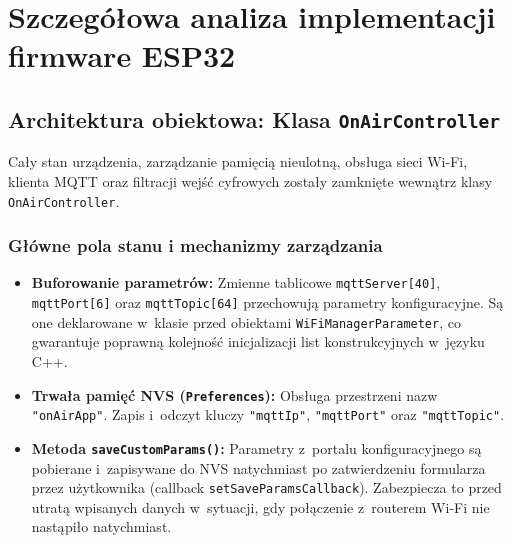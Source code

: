 \documentclass[11pt,a4paper]{article}
\begin{document}
\section{Szczegółowa analiza implementacji firmware ESP32}

\subsection{Architektura obiektowa: Klasa \texttt{OnAirController}}
Cały stan urządzenia, zarządzanie pamięcią nieulotną, obsługa sieci Wi-Fi, klienta MQTT oraz filtracji wejść cyfrowych zostały zamknięte wewnątrz klasy \texttt{OnAirController}.

\subsubsection{Główne pola stanu i mechanizmy zarządzania}
\begin{itemize}[leftmargin=1.5em]
    \item \textbf{Buforowanie parametrów:} Zmienne tablicowe \texttt{mqttServer[40]}, \texttt{mqttPort[6]} oraz \texttt{mqttTopic[64]} przechowują parametry konfiguracyjne. Są one deklarowane w~klasie przed obiektami \texttt{WiFiManagerParameter}, co gwarantuje poprawną kolejność inicjalizacji list konstrukcyjnych w~języku C++.
    \item \textbf{Trwała pamięć NVS (\texttt{Preferences}):} Obsługa przestrzeni nazw \texttt{"onAirApp"}. Zapis i~odczyt kluczy \texttt{"mqttIp"}, \texttt{"mqttPort"} oraz \texttt{"mqttTopic"}.
    \item \textbf{Metoda \texttt{saveCustomParams()}:} Parametry z~portalu konfiguracyjnego są pobierane i~zapisywane do NVS natychmiast po zatwierdzeniu formularza przez użytkownika (callback \texttt{setSaveParamsCallback}). Zabezpiecza to przed utratą wpisanych danych w~sytuacji, gdy połączenie z~routerem Wi-Fi nie nastąpiło natychmiast.
\end{itemize}
\end{document}
